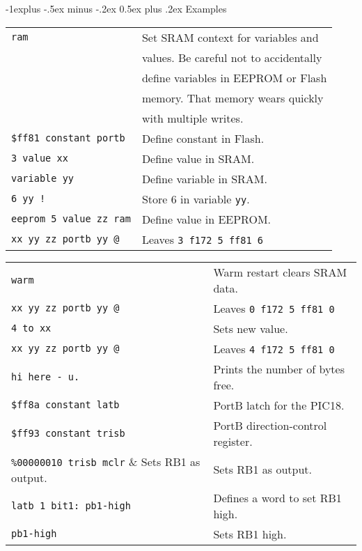 \documentclass[10pt,landscape,a4paper]{article}
\makeatletter
\renewcommand{\subsection}{\@startsection{subsection}{2}{0mm}%
                                {-1explus -.5ex minus -.2ex}%
                                {0.5ex plus .2ex}%
                                {\normalfont\normalsize\bfseries}}
\makeatother
\begin{document}
\begin{multicols}{3}
\medskip

\subsection{Examples}
\begin{tabular}{@{}ll@{}}
\verb!ram!  & Set SRAM context for variables and \\
            & values.  Be careful not to accidentally \\
            & define variables in EEPROM or Flash \\
            & memory.  That memory wears quickly \\
            & with multiple writes. \\
\verb!$ff81 constant portb!  & Define constant in Flash. \\
\verb!3 value xx!  & Define value in SRAM. \\
\verb!variable yy!  & Define variable in SRAM. \\
\verb?6 yy !?  & Store 6 in variable \verb!yy!. \\
\verb!eeprom 5 value zz ram!  &  Define value in EEPROM. \\
\verb!xx yy zz portb yy @!  & Leaves \verb!3 f172 5 ff81 6! \\
\end{tabular}
\begin{tabular}{@{}ll@{}}
\verb!warm!  & Warm restart clears SRAM data. \\
\verb!xx yy zz portb yy @!  & Leaves \verb!0 f172 5 ff81 0! \\
\verb!4 to xx!  & Sets new value. \\ 
\verb!xx yy zz portb yy @!  & Leaves \verb!4 f172 5 ff81 0! \\
\verb!hi here - u.! & Prints the number of bytes free. \\
\verb!$ff8a constant latb! & PortB latch for the PIC18. \\
\verb!$ff93 constant trisb! & PortB direction-control register. \\
\verb!%00000010 trisb mclr! & Sets RB1 as output. \\ 
\verb!latb 1 bit1: pb1-high! & Defines a word to set RB1 high. \\
\verb!pb1-high! & Sets RB1 high. \\
\end{tabular}

\bigskip


\end{multicols}
\end{document}
